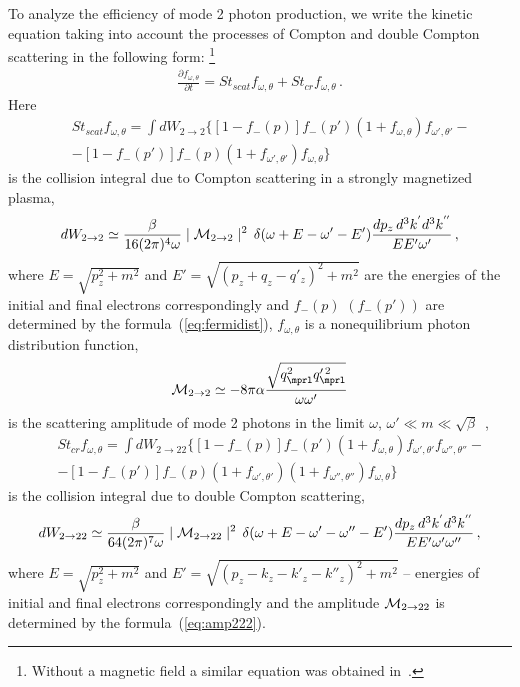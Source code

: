 \documentclass[
aps,%
12pt,%
final,%
notitlepage,%
oneside,%
onecolumn,%
nobibnotes,%
nofootinbib,%
superscriptaddress,%
noshowpacs,%
centertags]%
{revtex4}
\begin{document}
 To analyze the efficiency of mode 2 photon production, we write the kinetic equation taking into 
account the processes of Compton and double Compton scattering in the following form: 
\footnote{Without a magnetic field a similar 
equation was obtained in~\cite{Kellner1984}.}
%
\begin{eqnarray}
\label{eq:kinet1}
\frac{\partial f_{\omega, \theta}}{\partial t} = St_{scat}f_{\omega, \theta} + St_{cr}f_{\omega, \theta} \, .
\end{eqnarray}
\noindent Here
%
\begin{eqnarray}
\label{eq:kinet2}
&&St_{scat}f_{\omega,\theta} = \int dW_{2\to 2} \big \{[1-f_{-}(p)]f_{-}(p')
(1+f_{\omega, \theta})f_{\omega', \theta'} - 
\\
\nonumber
&& -
 [1-f_{-}(p')]f_{-}(p)(1+f_{\omega', \theta'})f_{\omega, \theta}\big \}
\end{eqnarray}
\noindent is the collision integral due to Compton scattering in a strongly magnetized plasma,
%
\begin{eqnarray}
\label{eq:kinet3}
dW_{2\to2} \simeq \frac{\beta}{16 (2\pi)^4
\omega}
\mid {\cal M}_{2\to 2}\mid^2 \,
\delta (\omega + E - \omega' - E') 
\frac{dp_z\,d^3 k^{'} d^3 k^{''}}{ E E' \omega'} \, ,
\end{eqnarray} 
\noindent where $E = \sqrt{p_z^2 + m^2}$ and $E' = \sqrt{(p_z + q_z - q'_z)^2
+ m^2}$ are the energies of the initial and final electrons correspondingly and $f_{-}(p)$  $(f_{-}(p'))$
are determined by the formula~(\ref{eq:fermidist}), $f_{\omega, \theta}$ is a nonequilibrium 
photon distribution function,
%
\begin{eqnarray}
\label{eq:kinet4}
{\cal M}_{2\to 2} \simeq -8 \pi \alpha \frac{\sqrt{q^2_{\mprl} q^{\prime \, 2}_{\mprl}}}
{\omega \omega^{\prime}}
\end{eqnarray} 
\noindent is the scattering amplitude of mode 2 photons in the limit 
$\omega, \, \omega' \ll m \ll \sqrt{\beta}$~\cite{RCh09},
%
\begin{eqnarray}
\label{eq:kinet5}
&&St_{cr}f_{\omega, \theta} = \int dW_{2\to 22} \big \{[1-f_{-}(p)]f_{-}(p')
(1+f_{\omega, \theta})f_{\omega' ,\theta'}f_{\omega'', \theta''} - 
\\
\nonumber
&&-[1-f_{-}(p')]f_{-}(p)(1+f_{\omega',\theta'})(1+f_{\omega'', \theta''})f_{\omega, \theta}\big \}
\end{eqnarray}
\noindent is the collision integral due to double Compton scattering,
%
\begin{eqnarray}
\label{eq:abs1}
dW_{2\to 22} \simeq \frac{\beta}{64 (2\pi)^7
\omega}
 \mid {\cal M}_{2\to 22}\mid^2  \,
\delta (\omega + E - \omega' -\omega''- E') 
\frac{dp_z\,d^3 k^{'} d^3 k^{''}}{ E E' \omega' \omega''} \, ,
\end{eqnarray}
\noindent where $E = \sqrt{p_z^2 + m^2}$ and
$E' = \sqrt{(p_z - k_z - k'_z - k''_z)^2 + m^2}$ -- energies of initial and final electrons
correspondingly and the amplitude ${\cal M}_{2\to 22}$ is determined by the formula~(\ref{eq:amp222}).
\end{document}
